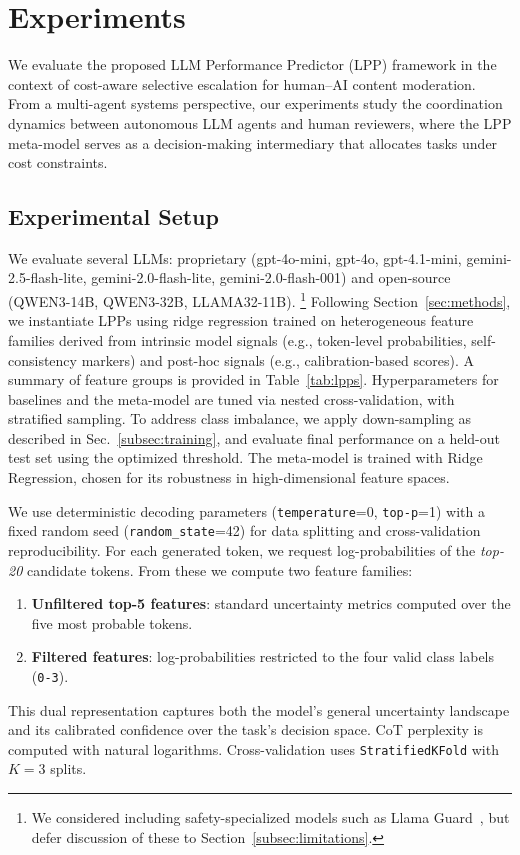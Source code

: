 \section{Experiments}
\label{sec:experiments}
We evaluate the proposed LLM Performance Predictor (LPP) framework in the context of cost-aware selective escalation for human–AI content moderation. From a multi-agent systems perspective, our experiments study the coordination dynamics between autonomous LLM agents and human reviewers, where the LPP meta-model serves as a decision-making intermediary that allocates tasks under cost constraints.
\subsection{Experimental Setup}
\label{subsec:experimental_setup}
We evaluate several LLMs: proprietary (gpt-4o-mini, gpt-4o, gpt-4.1-mini, gemini-2.5-flash-lite, gemini-2.0-flash-lite, gemini-2.0-flash-001) and open-source (QWEN3-14B, QWEN3-32B, LLAMA32-11B).
\footnote{We considered including safety-specialized models such as Llama Guard~\cite{Inan2023LlamaGL}, but defer discussion of these to Section~\ref{subsec:limitations}.}
Following Section~\ref{sec:methods}, we instantiate LPPs using ridge regression trained on heterogeneous feature families derived from intrinsic model signals (e.g., token-level probabilities, self-consistency markers) and post-hoc signals (e.g., calibration-based scores). A summary of feature groups is provided in Table~\ref{tab:lpps}. Hyperparameters for baselines and the meta-model are tuned via nested cross-validation, with stratified sampling. To address class imbalance, we apply down-sampling as described in Sec.~\ref{subsec:training}, and evaluate final performance on a held-out test set using the optimized threshold.
The meta-model is trained with Ridge Regression, chosen for its robustness in high-dimensional feature spaces.


We use deterministic decoding parameters (\texttt{temperature}=0, \texttt{top-p}=1) with a fixed random seed (\texttt{random\_state}=42) for data splitting and cross-validation reproducibility. For each generated token, we request log-probabilities of the \textit{top-20} candidate tokens. From these we compute two feature families:
\begin{enumerate}
    \item \textbf{Unfiltered top-5 features}: standard uncertainty metrics computed over the five most probable tokens.
    \item \textbf{Filtered features}: log-probabilities restricted to the four valid class labels (\texttt{0-3}).
\end{enumerate}
This dual representation captures both the model’s general uncertainty landscape and its calibrated confidence over the task’s decision space. CoT perplexity is computed with natural logarithms. Cross-validation uses \texttt{StratifiedKFold} with $K=3$ splits.

